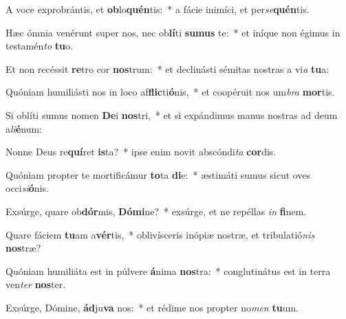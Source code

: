 \item A voce exprobrántis, et \textbf{ob}lo\textbf{quén}tis:~* a fácie inimíci, et per\textit{se}\textbf{quén}tis.
\item Hæc ómnia venérunt super nos, nec ob\textbf{lí}ti \textbf{su}\textbf{mus} te:~* et iníque non égimus in testamén\textit{to} \textbf{tu}o.
\item Et non recéssit \textbf{re}tro cor \textbf{nos}trum:~* et declinásti sémitas nostras a vi\textit{a} \textbf{tu}a:
\item Quóniam humiliásti nos in loco af\textbf{flic}ti\textbf{ó}nis,~* et coopéruit nos um\textit{bra} \textbf{mor}tis.
\item Si oblíti sumus nomen \textbf{De}i \textbf{nos}tri,~* et si expándimus manus nostras ad deum a\textit{li}\textbf{é}num:
\item Nonne Deus re\textbf{quí}ret \textbf{is}ta?~* ipse enim novit abscóndi\textit{ta} \textbf{cor}dis.
\item Quóniam propter te mortificámur \textbf{to}ta \textbf{di}e:~* æstimáti sumus sicut oves occi\textit{si}\textbf{ó}nis.
\item Exsúrge, quare ob\textbf{dór}mis, \textbf{Dó}\textbf{mi}ne?~* exsúrge, et ne repéllas \textit{in} \textbf{fi}nem.
\item Quare fáciem \textbf{tu}am a\textbf{vér}tis,~* oblivísceris inópiæ nostræ, et tribulatió\textit{nis} \textbf{nos}træ?
\item Quóniam humiliáta est in púlvere \textbf{á}nima \textbf{nos}tra:~* conglutinátus est in terra ven\textit{ter} \textbf{nos}ter.
\item Exsúrge, Dómine, \textbf{ád}ju\textbf{va} nos:~* et rédime nos propter no\textit{men} \textbf{tu}um.

